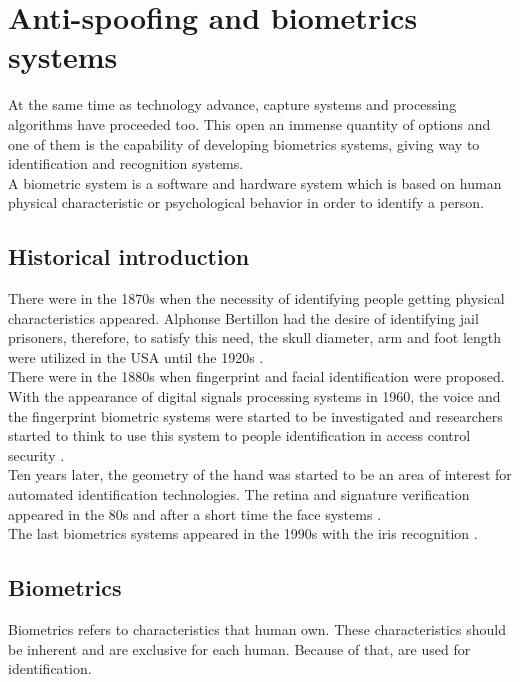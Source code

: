 \section{Anti-spoofing and biometrics systems}
At the same time as technology advance, capture systems and processing algorithms have proceeded too. This open an immense quantity of options and one of them is the capability of developing biometrics systems, giving way to identification and recognition systems.\\

A biometric system is a software and hardware system which is based on human physical characteristic or psychological behavior in order to identify a person.\\

\subsection{Historical introduction}
There were in the 1870s when the necessity of identifying people getting physical characteristics appeared. Alphonse Bertillon had the desire of identifying jail prisoners, therefore, to satisfy this need, the skull diameter, arm and foot length were utilized in the USA until the 1920s \cite{Intro_biometrics}.\\

There were in the 1880s when fingerprint and facial identification were proposed. With the appearance of digital signals processing systems in 1960, the voice and the fingerprint biometric systems were started to be investigated and researchers started to think to use this system to people identification in access control security \cite{Intro_biometrics}.\\

Ten years later, the geometry of the hand was started to be an area of interest for automated identification technologies. The retina and signature verification appeared in the 80s and after a short time the face systems \cite{Intro_biometrics}.\\

The last biometrics systems appeared in the 1990s with the iris recognition \cite{Intro_biometrics}.\\

\subsection{Biometrics}
Biometrics refers to characteristics that human own. These characteristics should be inherent and are exclusive for each human. Because of that, are used for identification.\\

